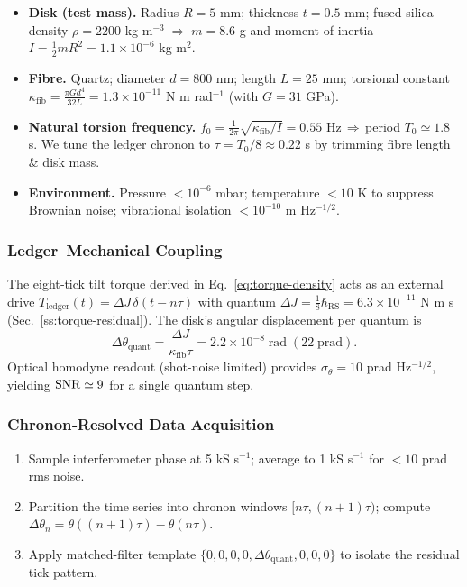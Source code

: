 \documentclass[11pt,oneside]{book}
\begin{document}
\begin{itemize}[leftmargin=*,itemsep=2pt]
\item \textbf{Disk (test mass).}  
      Radius $R = 5$ mm; thickness $t = 0.5$ mm; fused silica density
      $\rho = 2200$ kg m$^{-3} \;\Rightarrow\; m = 8.6$ g and moment of
      inertia $I = \tfrac12 m R^{2} = 1.1\times10^{-6}$ kg m$^{2}$.
\item \textbf{Fibre.}  
      Quartz; diameter $d = 800$ nm; length $L = 25$ mm;
      torsional constant
      $\kappa_{\mathrm{fib}} = \tfrac{\pi G d^{4}}{32L}
      = 1.3\times10^{-11}$ N m rad$^{-1}$
      (with $G=31$ GPa).
\item \textbf{Natural torsion frequency.}  
      $\displaystyle
      f_{0} = \frac{1}{2\pi}\sqrt{\kappa_{\mathrm{fib}}/I}
      = 0.55$ Hz\,$\Rightarrow$\,period
      $T_{0} \simeq 1.8$ s.
      We tune the ledger chronon to $\tau =T_{0}/8 \approx 0.22$ s
      by trimming fibre length \& disk mass.
\item \textbf{Environment.}  
      Pressure $<10^{-6}$ mbar; temperature $<10$ K to suppress
      Brownian noise; vibrational isolation $<10^{-10}$ m Hz$^{-1/2}$.
\end{itemize}

\subsubsection{Ledger–Mechanical Coupling}
\label{ss:torsion-coupling}

The eight‐tick tilt torque derived in
Eq.~\eqref{eq:torque-density} acts as an external drive
$T_{\text{ledger}}(t)=\Delta J\,\delta(t-n\tau)$
with quantum
$\Delta J = \tfrac18\hbar_{\mathrm{RS}}
          = 6.3\times10^{-11}$ N m s (Sec.~\ref{ss:torque-residual}).
The disk’s angular displacement per quantum is
\[
   \Delta\theta_{\text{quant}}
   = \frac{\Delta J}{\kappa_{\mathrm{fib}}\tau}
   = 2.2\times10^{-8}\;\text{rad}\;(22\;\text{prad}).
\]
Optical homodyne readout (shot-noise limited) provides
$\sigma_{\theta}=10$ prad Hz$^{-1/2}$, yielding ${\rm SNR}\simeq9$
for a single quantum step.

\subsubsection{Chronon‐Resolved Data Acquisition}
\label{ss:torsion-DAQ}

\begin{enumerate}[label=\arabic*.,leftmargin=*,itemsep=3pt]
\item Sample interferometer phase at 5 kS s$^{-1}$;
      average to 1 kS s$^{-1}$ for $<10$ prad rms noise.
\item Partition the time series into chronon windows
      $[n\tau,(n+1)\tau)$; compute
      $\Delta\theta_{n}
       =\theta((n+1)\tau)-\theta(n\tau)$.
\item Apply matched-filter template
      $\{0,0,0,0,\Delta\theta_{\text{quant}},0,0,0\}$ to isolate
      the residual tick pattern.
\end{enumerate}
\end{document}

